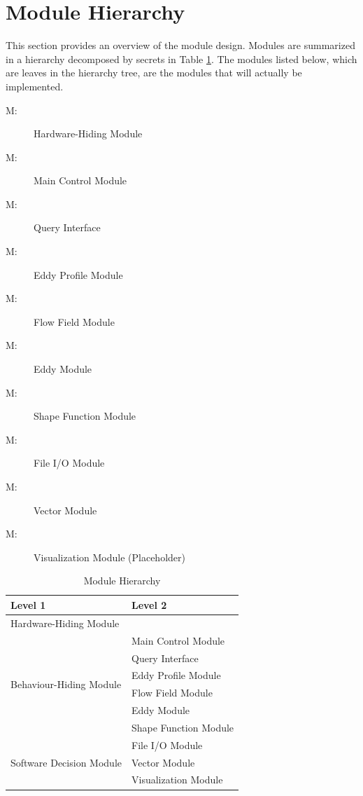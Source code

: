 \documentclass[12pt, titlepage]{article}
\newcounter{mnum}
\newcommand{\mthemnum}{M\themnum}
\begin{document}
\section{Module Hierarchy} \label{SecMH}

This section provides an overview of the module design. Modules are summarized
in a hierarchy decomposed by secrets in Table \ref{TblMH}. The modules listed
below, which are leaves in the hierarchy tree, are the modules that will
actually be implemented.

\begin{description}
\item [ \mthemnum \label{mHH}:] Hardware-Hiding Module
\item [ \mthemnum \label{mMain}:] Main Control Module
\item [ \mthemnum \label{mQuery}:] Query Interface
\item [ \mthemnum \label{mProf}:] Eddy Profile Module
\item [ \mthemnum \label{mFlow}:] Flow Field Module
\item [ \mthemnum \label{mEddy}:] Eddy Module
\item [ \mthemnum \label{mShape}:] Shape Function Module
\item [ \mthemnum \label{mFile}:] File I/O Module
\item [ \mthemnum \label{mVector}:] Vector Module
\item [ \mthemnum \label{mVisual}:] Visualization Module (Placeholder)
\end{description}


\begin{table}[h!]
\centering
\begin{tabular}{p{} p{}}
\toprule
\textbf{Level 1} & \textbf{Level 2}\\
\midrule

{Hardware-Hiding Module} & ~ \\
\midrule

\multirow{6}{0.3\textwidth}{Behaviour-Hiding Module}
& Main Control Module\\
& Query Interface\\
& Eddy Profile Module\\
& Flow Field Module\\
& Eddy Module\\
& Shape Function Module\\
\midrule

\multirow{3}{0.3\textwidth}{Software Decision Module} 
& File I/O Module\\
& Vector Module\\
& Visualization Module\\
\bottomrule

\end{tabular}
\caption{Module Hierarchy}
\label{TblMH}
\end{table}
\end{document}
